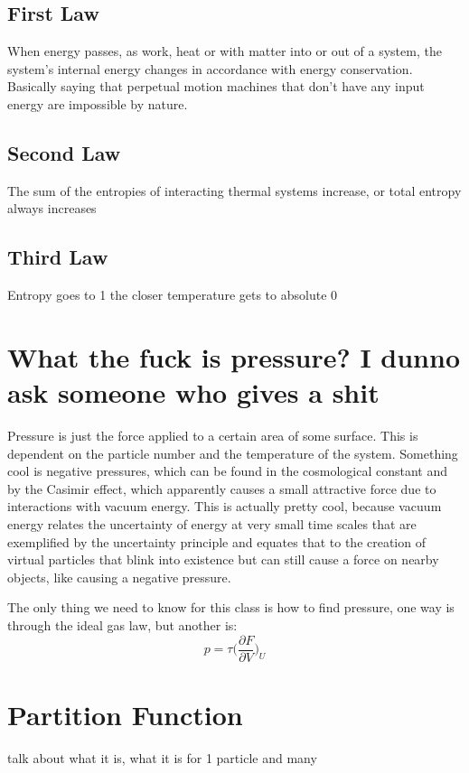\documentclass[arial]{article}
\begin{document}
\subsection*{First Law}
When energy passes, as work, heat or with matter into or out of a system, the system's internal energy changes in accordance with energy conservation. Basically saying that perpetual motion machines that don't have any input energy are impossible by nature.
\subsection*{Second Law}
The sum of the entropies of interacting thermal systems increase, or total entropy always increases
\subsection*{Third Law}
Entropy goes to 1 the closer temperature gets to absolute 0

\section*{What the fuck is pressure? I dunno ask someone who gives a shit}
Pressure is just the force applied to a certain area of some surface. This is dependent on the particle number and the temperature of the system. Something cool is negative pressures, which can be found in the cosmological constant and by the Casimir effect, which apparently causes a small attractive force due to interactions with vacuum energy. This is actually pretty cool, because vacuum energy relates the uncertainty of energy at very small time scales that are exemplified by the uncertainty principle and equates that to the creation of virtual particles that blink into existence but can still cause a force on nearby objects, like causing a negative pressure.
\vspace{3mm}

The only thing we need to know for this class is how to find pressure, one way is through the ideal gas law, but another is:
\begin{equation}
p=\tau \bigg(\frac{\partial F}{\partial V}\bigg)_U
\end{equation}

\section*{Partition Function}
talk about what it is, what it is for 1 particle and many
\end{document}
